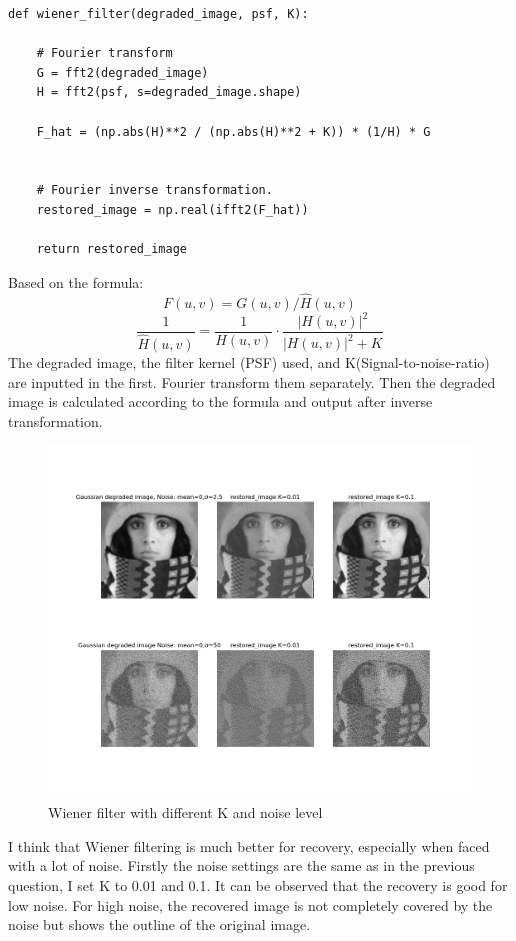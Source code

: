 \documentclass[12pt]{article}
\begin{document}
\subsection{}
\begin{lstlisting}
    
def wiener_filter(degraded_image, psf, K):

    # Fourier transform
    G = fft2(degraded_image)
    H = fft2(psf, s=degraded_image.shape)

    F_hat = (np.abs(H)**2 / (np.abs(H)**2 + K)) * (1/H) * G
   

    # Fourier inverse transformation.
    restored_image = np.real(ifft2(F_hat))

    return restored_image   

\end{lstlisting}
Based on the formula:
\[F(u,v) = G(u,v)/\hat{H}(u,v)\]
\[
\frac{1}{\hat{H}(u,v)}
= \frac{1}{H(u,v)} \cdot \frac{\lvert H(u,v)\rvert^2}{\lvert H(u,v)\rvert^2 + K}
\]
The degraded image, the filter kernel (PSF) used, and K(Signal-to-noise-ratio) are inputted in the first. Fourier transform them separately. Then the degraded image is calculated according to the formula and output after inverse transformation.

\begin{figure}[h]
    \centering
    \includegraphics[width=1\textwidth]{pics/a5_2.3.png} 
    \caption{Wiener filter with different K and noise level}
\end{figure}
I think that Wiener filtering is much better for recovery, especially when faced with a lot of noise. Firstly the noise settings are the same as in the previous question, I set K to 0.01 and 0.1.
It can be observed that the recovery is good for low noise. For high noise, the recovered image is not completely covered by the noise but shows the outline of the original image.
\end{document}
